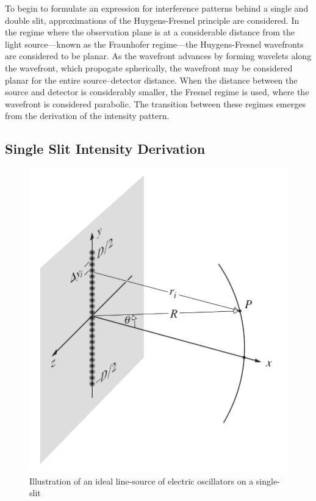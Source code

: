 \documentclass[a4paper]{article}
\begin{document}
To begin to formulate an expression for interference patterns behind a single and double slit, approximations of the Huygens-Fresnel principle are considered. In the regime where the observation plane is at a considerable distance from the light source---known as the Fraunhofer regime---the Huygens-Fresnel wavefronts are considered to be planar. As the wavefront advances by forming wavelets along the wavefront, which propogate spherically, the wavefront may be considered planar for the entire source--detector distance. When the distance between the source and detector is considerably smaller, the Fresnel regime is used, where the wavefront is considered parabolic. The transition between these regimes emerges from the derivation of the intensity pattern.

\subsection{Single Slit Intensity Derivation} \label{sec:single}
\begin{figure}[h]
  \centerline{\includegraphics[scale=0.25]{fraunhofer.png}}
  \captionsetup{justification=centering}
  \caption{Illustration of an ideal line-source of electric oscillators on a single-slit \cite[Fig.\ 10.5]{RefWorks:doc:60689ea38f08cf86c9dc700e}}
  \label{fig:fraunhofer}
\end{figure}
\end{document}
